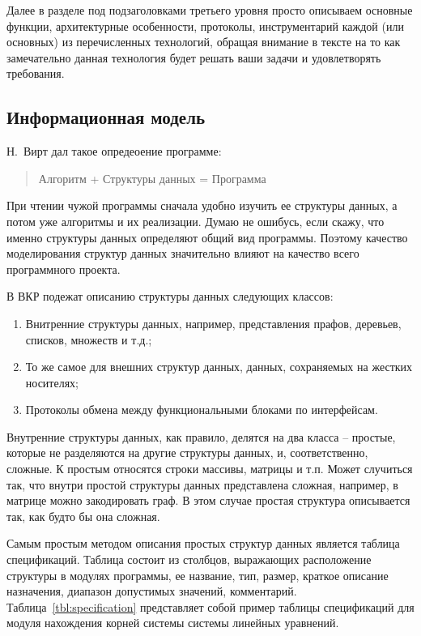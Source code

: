 \documentclass[a4paper,14pt,final]{extreport}
\begin{document}
Далее в разделе под подзаголовками третьего уровня просто описываем основные функции, архитектурные особенности, протоколы, инструментарий каждой (или основных) из перечисленных технологий, обращая внимание в тексте на то как замечательно данная технология будет решать ваши задачи и удовлетворять требования.

\subsection{Информационная модель}
\label{sec:infomod}

Н.~Вирт дал такое опредеоение программе:
\begin{quote}
  Алгоритм + Структуры данных = Программа
\end{quote}
При чтении чужой программы сначала удобно изучить ее структуры данных, а потом уже алгоритмы и их реализации.  Думаю не ошибусь, если скажу, что именно структуры данных определяют общий вид программы.  Поэтому качество моделирования структур данных значительно влияют на качество всего программного проекта.

В ВКР подежат описанию структуры данных следующих классов:
\begin{enumerate}
\item Внитренние структуры данных, например, представления прафов, деревьев, списков, множеств и т.д.;
\item То же самое для внешних структур данных, данных, сохраняемых на жестких носителях;
\item Протоколы обмена между функциональными блоками по интерфейсам.
\end{enumerate}

Внутренние структуры данных, как правило, делятся на два класса -- простые, которые не разделяются на другие структуры данных, и, соответственно, сложные.  К простым относятся строки массивы, матрицы и т.п.  Может случиться так, что внутри простой структуры данных представлена сложная, например, в матрице можно закодировать граф.  В этом случае простая структура описывается так, как будто бы она сложная.

Самым простым методом описания простых структур данных является таблица спецификаций.  Таблица состоит из столбцов, выражающих расположение структуры в модулях программы, ее название, тип, размер, краткое описание назначения, диапазон допустимых значений, комментарий.  Таблица~\ref{tbl:specification} представляет собой пример таблицы спецификаций для модуля нахождения корней системы системы линейных уравнений.
\begin{table}[hbt]
  \centering

  \caption[Таблица спецификаций (пример)]{Таблица спецификаций модуля решения системы линейных уравнений}
  \label{tab:specification}
\end{table}
\end{document}
